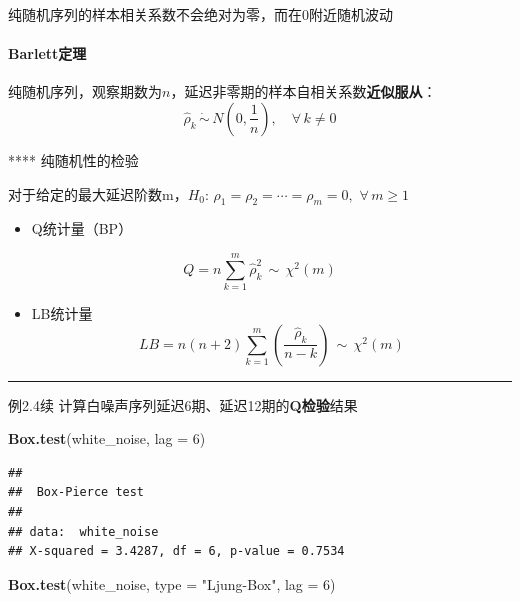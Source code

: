 \documentclass[]{article}
\newenvironment{Shaded}{\begin{snugshade}}{\end{snugshade}}
\newcommand{\DataTypeTok}[1]{\textcolor[rgb]{0.13,0.29,0.53}{#1}}
\newcommand{\DecValTok}[1]{\textcolor[rgb]{0.00,0.00,0.81}{#1}}
\newcommand{\KeywordTok}[1]{\textcolor[rgb]{0.13,0.29,0.53}{\textbf{#1}}}
\newcommand{\NormalTok}[1]{#1}
\newcommand{\StringTok}[1]{\textcolor[rgb]{0.31,0.60,0.02}{#1}}
\providecommand{\tightlist}{%
  \setlength{\itemsep}{0pt}\setlength{\parskip}{0pt}}
\let\oldparagraph\paragraph
\renewcommand{\paragraph}[1]{\oldparagraph{#1}\mbox{}}
\begin{document}
纯随机序列的样本相关系数不会绝对为零，而在0附近随机波动

\hypertarget{barlettux5b9aux7406}{%
\paragraph{Barlett定理}\label{barlettux5b9aux7406}}

纯随机序列，观察期数为\(n\)，延迟非零期的样本自相关系数\textbf{近似服从}：
\[
\hat{\rho}_k \, \dot{\sim} \, N(0,\frac{1}{n}),\quad \forall\,k\ne0
\]

**** 纯随机性的检验

对于给定的最大延迟阶数m，\(H_0:\,\rho_1=\rho_2=\cdots=\rho_m=0,\,\,\forall\,m\geqslant1\)

\begin{itemize}
\tightlist
\item
  Q统计量（BP）
\end{itemize}

\[
Q = n\sum\limits_{k=1}^{m}\hat{\rho}^2_k\,\sim\,\chi^2(m)
\]

\begin{itemize}
\tightlist
\item
  LB统计量 \[
  LB = n(n+2)\sum\limits_{k=1}^{m}\left(\frac{\hat{\rho}_k}{n-k}\right)\,\sim\,\chi^2(m)
  \]
\end{itemize}

\begin{center}\rule{0.5\linewidth}{\linethickness}\end{center}

例2.4续 计算白噪声序列延迟6期、延迟12期的\textbf{Q检验}结果

\begin{Shaded}
\begin{Highlighting}[]
\KeywordTok{Box.test}\NormalTok{(white_noise, }\DataTypeTok{lag =} \DecValTok{6}\NormalTok{)}
\end{Highlighting}
\end{Shaded}

\begin{verbatim}
## 
##  Box-Pierce test
## 
## data:  white_noise
## X-squared = 3.4287, df = 6, p-value = 0.7534
\end{verbatim}

\begin{Shaded}
\begin{Highlighting}[]
\KeywordTok{Box.test}\NormalTok{(white_noise, }\DataTypeTok{type =} \StringTok{"Ljung-Box"}\NormalTok{, }\DataTypeTok{lag =} \DecValTok{6}\NormalTok{)}
\end{Highlighting}
\end{Shaded}
\end{document}
